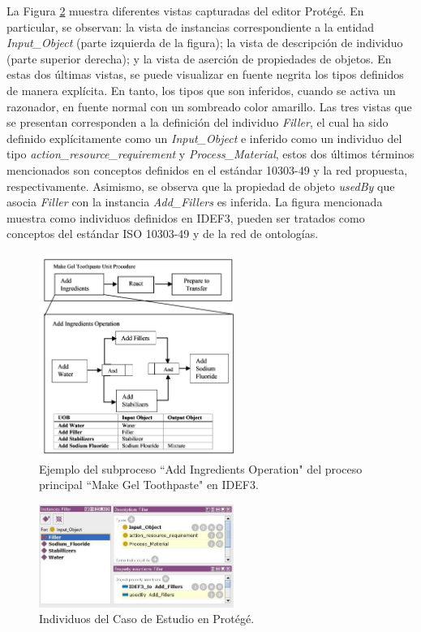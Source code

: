 \documentclass[journal]{IEEEtran}
\begin{document}
La Figura \ref{fig11} muestra diferentes vistas capturadas del editor Prot\'eg\'e. En particular, se observan: la vista de instancias correspondiente a la entidad \emph{Input\_Object} (parte izquierda de la figura); la vista de descripci\'on de individuo (parte superior derecha); y la vista de aserci\'on de propiedades de objetos. En estas dos \'ultimas vistas, se puede visualizar en fuente negrita los tipos definidos de manera expl\'icita. En tanto, los tipos que son inferidos, cuando se activa un razonador, en fuente normal con un sombreado color amarillo.  Las tres vistas que se presentan corresponden a la definici\'on del individuo \emph{Filler}, el cual ha sido definido expl\'icitamente como un \emph{Input\_Object} e inferido como un individuo del tipo \emph{action\_resource\_requirement} y \emph{Process\_Material}, estos dos \'ultimos t\'erminos mencionados son conceptos definidos en el est\'andar 10303-49 y la red propuesta, respectivamente. Asimismo, se observa que la propiedad de objeto \emph{usedBy} que asocia \emph{Filler} con la instancia \emph{Add\_Fillers} es inferida. La figura mencionada muestra como individuos definidos en IDEF3, pueden ser tratados como conceptos del est\'andar ISO 10303-49 y de la red de ontolog\'ias.


\begin{figure}[!t]
\centering
\includegraphics[width=2.5in]{figures/figure10.png}
\caption{Ejemplo del subproceso ``Add Ingredients Operation" del proceso principal ``Make Gel Toothpaste" en IDEF3.}
\label{fig10}
\end{figure}

\begin{figure}[!t]
\centering
\includegraphics[width=2.5in]{figures/figure11.jpg}
\caption{Individuos del Caso de Estudio en Prot\'eg\'e.}
\label{fig11}
\end{figure}
\end{document}
